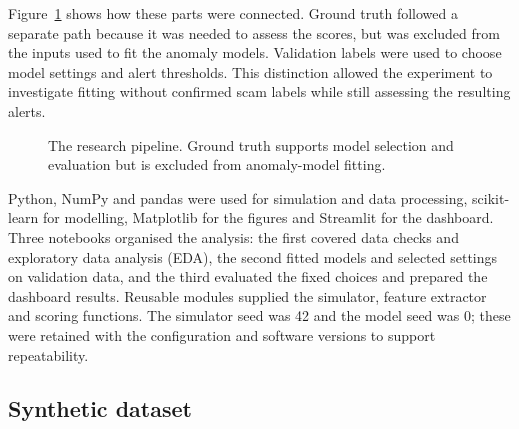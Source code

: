 \documentclass[11pt,a4paper]{article}
\begin{document}
Figure~\ref{fig:pipeline} shows how these parts were connected. Ground truth followed a separate path because it was needed to assess the scores, but was excluded from the inputs used to fit the anomaly models. Validation labels were used to choose model settings and alert thresholds. This distinction allowed the experiment to investigate fitting without confirmed scam labels while still assessing the resulting alerts.

\begin{figure}[htbp]
\centering
{}
\caption{The research pipeline. Ground truth supports model selection and evaluation but is excluded from anomaly-model fitting.}
\label{fig:pipeline}
\end{figure}

Python, NumPy and pandas were used for simulation and data processing, scikit-learn for modelling, Matplotlib for the figures and Streamlit for the dashboard. Three notebooks organised the analysis: the first covered data checks and exploratory data analysis (EDA), the second fitted models and selected settings on validation data, and the third evaluated the fixed choices and prepared the dashboard results. Reusable modules supplied the simulator, feature extractor and scoring functions. The simulator seed was 42 and the model seed was 0; these were retained with the configuration and software versions to support repeatability.

\subsection{Synthetic dataset}
\end{document}
